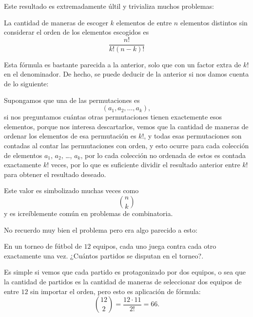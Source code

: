 Este resultado es extremadamente últil y trivializa
muchos problemas:
\begin{example}
	La cantidad de maneras de escoger $k$
	elementos de entre $n$ elementos distintos
	sin considerar el orden de los elementos escogidos
	es
	\[\frac{n!}{k!(n - k)!}\]
\end{example}
Esta fórmula es bastante parecida a la anterior,
solo que con un factor extra de $k!$ en el denominador.
De hecho, se puede deducir de la anterior si nos
damos cuenta de lo siguiente:

Supongamos que una de las permutaciones es
\[(a_1, a_2, \dots, a_k),\]
si nos preguntamos cuántas otras permutaciones
tienen exactemente esos elementos, porque
nos interesa descartarlos, vemos que la cantidad
de maneras de ordenar los elementos
de esa permutación es $k!$, y todas esas permutaciones
son contadas al contar las permutaciones con orden,
y esto ocurre para cada colección de
elementos $a_1$, $a_2$, \dots, $a_k$, por lo
cada colección no ordenada de estos
es contada exactamente $k!$ veces, por lo que
es suficiente dividir el resultado anterior
entre $k!$ para obtener el resultado deseado.

Este valor es simbolizado muchas veces como
\[n \choose k\]
y es icreíblemente común en problemas de combinatoria.

No recuerdo muy bien el problema pero era algo
parecido a esto:
\begin{example}
	En un torneo de fútbol de $12$ equipos, cada
	uno juega contra cada otro exactamente una vez.
	¿Cuántos partidos se disputan en el torneo?.
\end{example}
Es simple si vemos que cada partido
es protagonizado por dos equipos,
o sea que la cantidad de partidos
es la cantidad de maneras de seleccionar dos equipos
de entre $12$ sin importar el orden, pero esto
es aplicación de fórmula:
\[{12\choose{2}} = \frac{12 \cdot 11 }{2!} = 66.\]

